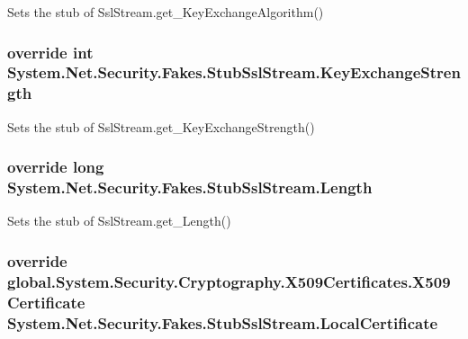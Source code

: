 Sets the stub of Ssl\-Stream.\-get\-\_\-\-Key\-Exchange\-Algorithm()

\hypertarget{class_system_1_1_net_1_1_security_1_1_fakes_1_1_stub_ssl_stream_ae82c3cef1dbd22aaae1ce461266e8757}{
\subsubsection[{Key\-Exchange\-Strength}]{\setlength{\rightskip}{0pt plus 5cm}override int System.\-Net.\-Security.\-Fakes.\-Stub\-Ssl\-Stream.\-Key\-Exchange\-Strength\hspace{0.3cm}{\ttfamily [get]}}}\label{class_system_1_1_net_1_1_security_1_1_fakes_1_1_stub_ssl_stream_ae82c3cef1dbd22aaae1ce461266e8757}


Sets the stub of Ssl\-Stream.\-get\-\_\-\-Key\-Exchange\-Strength()

\hypertarget{class_system_1_1_net_1_1_security_1_1_fakes_1_1_stub_ssl_stream_ad543683d6aaef8fc329663b075f16e9c}{
\subsubsection[{Length}]{\setlength{\rightskip}{0pt plus 5cm}override long System.\-Net.\-Security.\-Fakes.\-Stub\-Ssl\-Stream.\-Length\hspace{0.3cm}{\ttfamily [get]}}}\label{class_system_1_1_net_1_1_security_1_1_fakes_1_1_stub_ssl_stream_ad543683d6aaef8fc329663b075f16e9c}


Sets the stub of Ssl\-Stream.\-get\-\_\-\-Length()

\hypertarget{class_system_1_1_net_1_1_security_1_1_fakes_1_1_stub_ssl_stream_a64a1c19b60beea3650418aec75c9244c}{
\subsubsection[{Local\-Certificate}]{\setlength{\rightskip}{0pt plus 5cm}override global.\-System.\-Security.\-Cryptography.\-X509\-Certificates.\-X509\-Certificate System.\-Net.\-Security.\-Fakes.\-Stub\-Ssl\-Stream.\-Local\-Certificate\hspace{0.3cm}{\ttfamily [get]}}}\label{class_system_1_1_net_1_1_security_1_1_fakes_1_1_stub_ssl_stream_a64a1c19b60beea3650418aec75c9244c}


